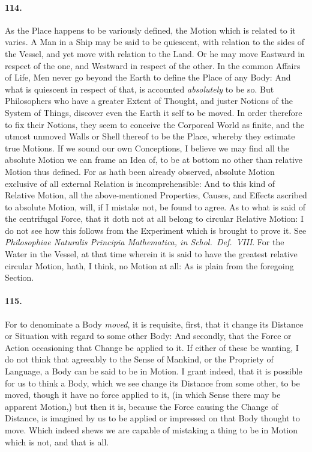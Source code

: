 \documentclass[]{article}
\newenvironment{sectionbody}{\begin{multicols}{2}}{\end{multicols}}
\begin{document}
\begin{sectionbody}
\paragraph{114.} As the Place happens to be variously defined, the Motion which is
related to it varies.  A Man in a Ship may be said to be
quiescent, with relation to the sides of the Vessel, and yet move
with relation to the Land.  Or he may move Eastward in respect of
the one, and Westward in respect of the other.  In the common
Affairs of Life, Men never go beyond the Earth to define the
Place of any Body: And what is quiescent in respect of that, is
accounted \emph{absolutely} to be so.  But Philosophers who
have a greater Extent of Thought, and juster Notions of the
System of Things, discover even the Earth it self to be moved.
In order therefore to fix their Notions, they seem to conceive
the Corporeal World as finite, and the utmost unmoved Walls or
Shell thereof to be the Place, whereby they estimate true
Motions.  If we sound our own Conceptions, I believe we may find
all the absolute Motion we can frame an Idea of, to be at bottom
no other than relative Motion thus defined.  For as hath been
already observed, absolute Motion exclusive of all external
Relation is incomprehensible: And to this kind of Relative
Motion, all the above-mentioned Properties, Causes, and Effects
ascribed to absolute Motion, will, if I mistake not, be found to
agree.  As to what is said of the centrifugal Force, that it doth
not at all belong to circular Relative Motion: I do not see how
this follows from the Experiment which is brought to prove it.
See \emph{Philosophiae Naturalis Principia Mathematica, in
Schol.\ Def.~VIII}.  For the Water in the Vessel, at that time
wherein it is said to have the greatest relative circular Motion,
hath, I think, no Motion at all: As is plain from the foregoing
Section.



\paragraph{115.} For to denominate a Body \emph{moved}, it is requisite, first,
that it change its Distance or Situation with regard to some
other Body: And secondly, that the Force or Action occasioning
that Change be applied to it.  If either of these be wanting, I
do not think that agreeably to the Sense of Mankind, or the
Propriety of Language, a Body can be said to be in Motion.  I
grant indeed, that it is possible for us to think a Body, which
we see change its Distance from some other, to be moved, though
it have no force applied to it, (in which Sense there may be
apparent Motion,) but then it is, because the Force causing the
Change of Distance, is imagined by us to be applied or impressed
on that Body thought to move.  Which indeed shews we are capable
of mistaking a thing to be in Motion which is not, and that is
all.




\end{sectionbody}
\end{document}
